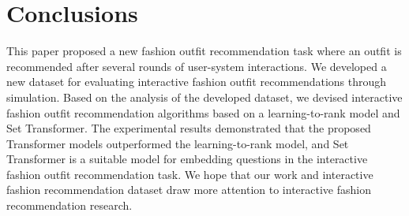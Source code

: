 \chapter{Conclusions}
\label{sq:conclusions}

This paper proposed a new fashion outfit recommendation task 
where an outfit is recommended after several rounds of user-system interactions.
We developed a new dataset for evaluating interactive fashion outfit recommendations through simulation.
Based on the analysis of the developed dataset, 
we devised interactive fashion outfit recommendation algorithms based on a learning-to-rank model and Set Transformer.
The experimental results demonstrated that 
the proposed Transformer models outperformed the learning-to-rank model,
and Set Transformer is a suitable model for embedding questions in the interactive fashion outfit recommendation task.
We hope that our work and interactive fashion recommendation dataset draw more attention to interactive fashion recommendation research.